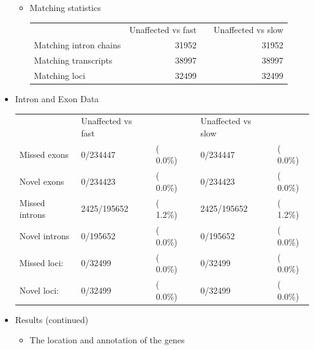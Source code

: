 \documentclass[11pt]{article}
\begin{document}
\begin{itemize}
\begin{itemize}
\item Matching statistics   


\begin{center}
\begin{tabular}{lrlr}
                         &  Unaffected vs fast  &     &  Unaffected vs slow  \\
 Matching intron chains  &               31952  &     &               31952  \\
 Matching transcripts    &               38997  &     &               38997  \\
 Matching loci           &               32499  &     &               32499  \\
\end{tabular}
\end{center}


\end{itemize}

\item Intron and Exon Data


\begin{center}
\begin{tabular}{llllll}
                 &  Unaffected vs fast  &             &     &  Unaffected vs slow  &            \\
 Missed exons    &  0/234447            &  (  0.0\%)  &     &  0/234447            &  ( 0.0\%)  \\
 Novel exons     &  0/234423            &  (  0.0\%)  &     &  0/234423            &  ( 0.0\%)  \\
 Missed introns  &  2425/195652         &  (  1.2\%)  &     &  2425/195652         &  ( 1.2\%)  \\
 Novel introns   &  0/195652            &  (  0.0\%)  &     &  0/195652            &  ( 0.0\%)  \\
 Missed loci:    &  0/32499             &  (  0.0\%)  &     &  0/32499             &  ( 0.0\%)  \\
 Novel loci:     &  0/32499             &  (  0.0\%)  &     &  0/32499             &  ( 0.0\%)  \\
\end{tabular}
\end{center}


\item Results (continued)

\begin{itemize}
\item The location and annotation of the genes


\end{itemize}
\end{itemize}
\end{document}
